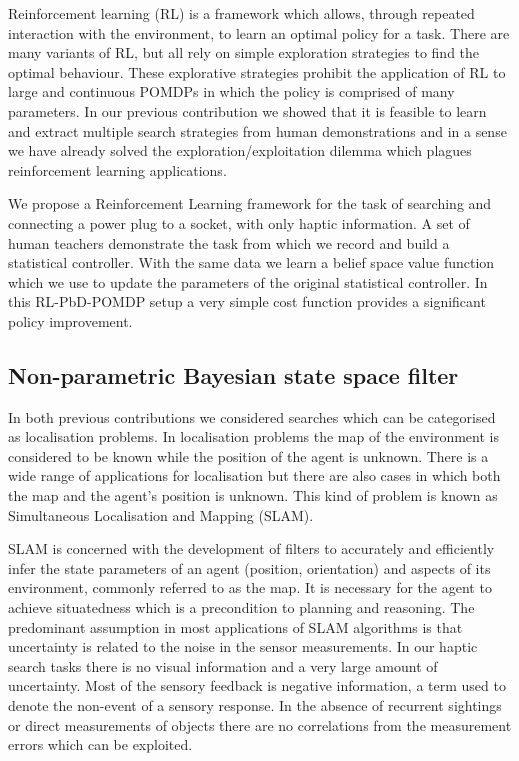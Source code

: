 Reinforcement learning (RL) is a framework which allows, through repeated interaction with the environment, to 
learn an optimal policy for a task. There are many variants of RL, but all rely on simple exploration strategies to find the optimal 
behaviour. These explorative strategies prohibit the application of RL to large and continuous POMDPs in which the policy 
is comprised of many parameters. In our previous contribution we showed that it is feasible to learn and extract 
multiple search strategies from human demonstrations and in a sense we have already solved the exploration/exploitation dilemma 
which plagues reinforcement learning applications. 

We propose a Reinforcement Learning framework for the task of searching and connecting a power plug to a socket, 
with only haptic information. A set of human teachers demonstrate the task from which we record and build a 
statistical controller. With the same data we learn a belief space value function which we use to update
the parameters of the original statistical controller.
In this RL-PbD-POMDP setup a very simple cost function provides a significant policy improvement.

\subsection{Non-parametric Bayesian state space filter}\label{sub:contr3}


In both previous contributions we considered searches which can be categorised as localisation problems.
In localisation problems the map of the environment is considered to be known while the position of the agent is unknown.
There is a wide range of applications for localisation but there are also cases in which both the map  
and the agent's position is unknown. This kind of problem is known as Simultaneous Localisation and Mapping (SLAM).

SLAM is concerned with the development of filters to accurately and efficiently infer 
the state parameters of an agent (position, orientation) and aspects of its environment, commonly referred to as the map. 
It is necessary for the agent to achieve situatedness which is a precondition to planning and reasoning. The 
predominant assumption in most applications of SLAM algorithms is that uncertainty is related to the noise in the sensor measurements. In 
our haptic search tasks there is no visual information and a very large amount of uncertainty. Most of the sensory
feedback is negative information, a term used to denote the non-event of a sensory response.
In the absence of recurrent sightings or direct measurements of objects there are no correlations from the measurement errors 
which can be exploited. 

